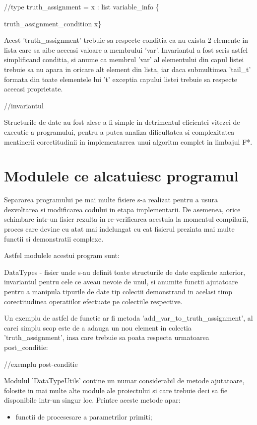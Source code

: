 //type truth\_assignment = x : list variable\_info \{{truth\_assignment\_condition x\}


Acest 'truth\_assignment' trebuie sa respecte conditia ca nu exista 2 elemente in lista care sa aibe aceeasi valoare a membrului 'var'. Invariantul a fost scris astfel simplificand conditia, si anume ca membrul 'var' al elementului din capul listei trebuie sa nu apara in oricare alt element din lista, iar daca submultimea 'tail\_t' formata din toate elementele lui 't' exceptia capului listei trebuie sa respecte aceeasi proprietate.

//invariantul

Structurile de date au fost alese a fi simple in detrimentul eficientei vitezei de executie a programului, pentru a putea analiza dificultatea si complexitatea mentinerii corectitudinii in implementarrea unui algoritm complet in limbajul F*. 



\section{Modulele ce alcatuiesc programul}

Separarea programului pe mai multe fisiere s-a realizat pentru a usura dezvoltarea si modificarea codului in etapa implementarii. De asemenea, orice schimbare intr-un fisier rezulta in re-verificarea acestuia la momentul compilarii, proces care devine cu atat mai indelungat cu cat fisierul prezinta mai multe functii si demonstratii complexe.

Astfel modulele acestui program sunt:

DataTypes - fisier unde s-au definit toate structurile de date explicate anterior, invariantul pentru cele ce aveau nevoie de unul, si anumite functii ajutatoare pentru a manipula tipurile de date tip colectii demonstrand in acelasi timp corectitudinea operatiilor efectuate pe colectiile respective. 

Un exemplu de astfel de functie ar fi metoda
'add\_var\_to\_truth\_assignment', al carei simplu scop este de a adauga un nou element in colectia 'truth\_assignment', insa care trebuie sa poata respecta urmatoarea post\_conditie:

//exemplu post-conditie


Modulul 'DataTypeUtils' contine un numar considerabil de metode ajutatoare, folosite in mai multe alte module ale proiectului si care trebuie deci sa fie disponibile intr-un singur loc. Printre aceste metode apar:
\begin{itemize}
	\item  functii de procesesare a parametrilor primiti;
	

\end{itemize}}
